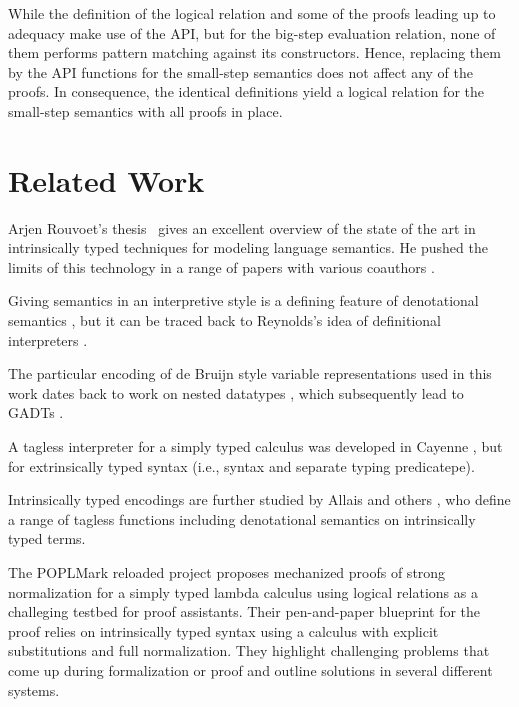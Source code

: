 \documentclass[acmsmall,anonymous,review,screen]{acmart}
\begin{document}
While the definition of the logical relation and some of the proofs leading up to adequacy make use of the API, but for the big-step evaluation relation, none of them performs pattern matching against its constructors. Hence, replacing them by the API functions for the small-step semantics does not affect any of the proofs.
In consequence, the identical definitions yield a logical relation for
the small-step semantics with all proofs in place.


\section{Related Work}
\label{sec:related-work}

Arjen Rouvoet's thesis~\cite{DBLP:phd/basesearch/Rouvoet21} gives an
excellent overview of the state of the art in intrinsically typed
techniques for modeling language semantics. He pushed the limits of
this technology in a range of papers with various coauthors
\cite{DBLP:journals/pacmpl/RestPRVM22,DBLP:journals/pacmpl/RouvoetKV21,DBLP:conf/cpp/RouvoetPKV20,DBLP:journals/pacmpl/PoulsenRTKV18}. 

Giving semantics in an interpretive style is a defining feature of
denotational semantics \cite{Schmidt1986}, but it can be traced back
to Reynolds's idea of definitional interpreters \cite{Reynolds1975}.

The particular encoding of de Bruijn style variable representations
used in this work dates back to work on nested datatypes
\cite{DBLP:conf/mpc/BirdM98,DBLP:journals/jfp/BirdP99,DBLP:conf/csl/AltenkirchR99},
which subsequently lead to GADTs
\cite{cheney03:_first_class_phant_types}.

A tagless interpreter for a simply typed calculus was developed in
Cayenne \cite{augustsson99}, but for extrinsically typed syntax (i.e.,
syntax and separate typing predicatepe).

Intrinsically typed encodings are further studied by Allais and others
\cite{DBLP:conf/cpp/Allais0MM17}, who define a range of tagless
functions including denotational semantics on intrinsically typed
terms. 

The POPLMark reloaded project \cite{DBLP:journals/jfp/AbelAHPMSS19} proposes
mechanized proofs of strong normalization for a simply typed lambda
calculus using logical relations as a challeging testbed for proof
assistants. Their pen-and-paper blueprint for the proof relies on
intrinsically typed syntax using a calculus with explicit
substitutions and full normalization. They highlight challenging
problems that come up during formalization or proof and outline
solutions in several different systems. 
\end{document}
